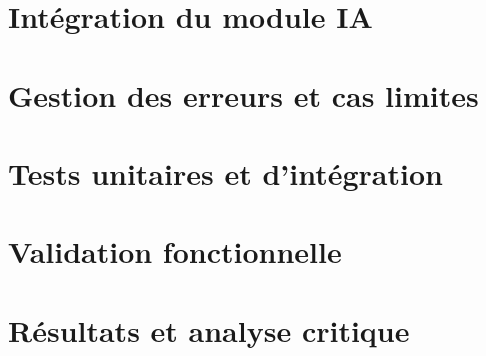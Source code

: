 \section{Intégration du module IA}
\label{sec:04-implementation-validation-6}

\section{Gestion des erreurs et cas limites}
\label{sec:04-implementation-validation-7}

\section{Tests unitaires et d'intégration}
\label{sec:04-implementation-validation-8}

\section{Validation fonctionnelle}
\label{sec:04-implementation-validation-9}

\section{Résultats et analyse critique}
\label{sec:04-implementation-validation-10}
